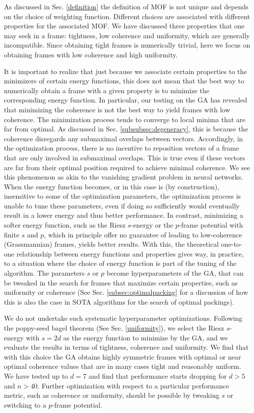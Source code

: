 \documentclass[%
superscriptaddress,
amsmath,amssymb,
 aps,
pra,
floatfix,
]{revtex4-2}
\begin{document}
As discussed in Sec. \ref{definition} the definition of MOF is not unique and depends on the choice of weighting function. Different choices are associated with different properties for the associated MOF. We have discussed three properties that one may seek in a frame: tightness, low coherence and uniformity, which are generally incompatible. Since obtaining tight frames is numerically trivial, here we focus on obtaining frames with low coherence and high uniformity. 

It is important to realize that just because we associate certain properties to the minimizers of certain energy functions, this does not mean that the best way to numerically obtain a frame with a given property is to minimize the corresponding energy function. In particular, our testing on the GA has revealed that minimizing the coherence is not the best way to yield frames with low coherence. The minimization process tends to converge to local minima that are far from optimal. As discussed in Sec. \ref{subsubsec:degeneracy}, this is because the coherence disregards any submaximal overlaps between vectors. Accordingly, in the optimization process, there is no incentive to reposition vectors of a frame that are only involved in submaximal overlaps. This is true even if these vectors are far from their optimal position required to achieve minimal coherence. We see this phenomenon as akin to the vanishing gradient problem in neural networks. When the energy function becomes, or in this case is (by construction), insensitive to some of the optimization parameters, the optimization process is unable to tune these parameters, even if doing so sufficiently would eventually result in a lower energy and thus better performance. In contrast, minimizing a softer energy function, such as the Riesz $s$-energy or the $p$-frame potential with finite $s$ and $p$, which in principle offer no guarantee of leading to low-coherence (Grassmannian) frames, yields better results.
With this, the theoretical one-to-one relationship between energy functions and properties gives way, in practice, to a situation where the choice of energy function is part of the tuning of the algorithm. The parameters $s$ or $p$ become hyperparameters of the GA, that can be tweaked in the search for frames that maximize certain properties, such as uniformity or coherence (See Sec. \ref{subsec:optimalpacking} for a discussion of how this is also the case in SOTA algorithms for the search of optimal packings). 

We do not undertake such systematic hyperparameter optimizations. Following the poppy-seed bagel theorem (See Sec. \ref{uniformity}), we select the Riesz $s$-energy with $s=2d$ as the energy function to minimize by the GA, and we evaluate the results in terms of tightness, coherence and uniformity. We find that with this choice the GA obtains highly symmetric frames with optimal or near optimal coherence values that are in many cases tight and reasonably uniform. We have tested up to $d=7$ and find that performance starts dropping for $d > 5$ and $n > 40$. Further optimization with respect to a particular performance metric, such as coherence or uniformity, should be possible by tweaking $s$ or switching to a $p$-frame potential.
\end{document}

